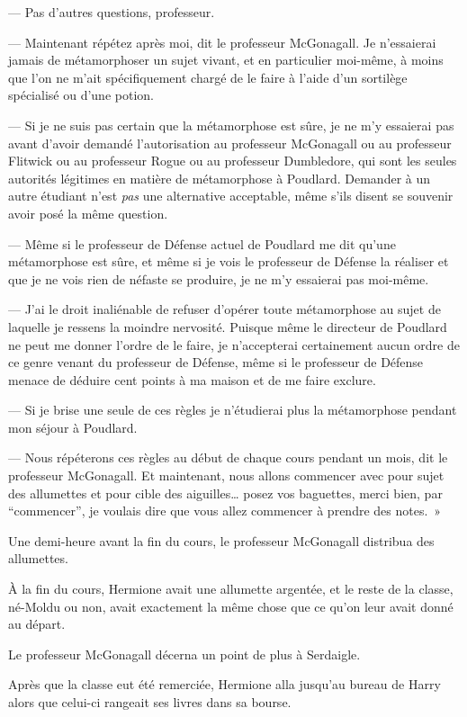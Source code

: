 --- Pas d'autres questions, professeur.

--- Maintenant répétez après moi, dit le professeur McGonagall. Je n'essaierai jamais de métamorphoser un sujet vivant, et en particulier moi-même, à moins que l'on ne m'ait spécifiquement chargé de le faire à l'aide d'un sortilège spécialisé ou d'une potion.

--- Si je ne suis pas certain que la métamorphose est sûre, je ne m'y essaierai pas avant d'avoir demandé l'autorisation au professeur McGonagall ou au professeur Flitwick ou au professeur Rogue ou au professeur Dumbledore, qui sont les seules autorités légitimes en matière de métamorphose à Poudlard. Demander à un autre étudiant n'est \emph{pas} une alternative acceptable, même s'ils disent se souvenir avoir posé la même question.

--- Même si le professeur de Défense actuel de Poudlard me dit qu'une métamorphose est sûre, et même si je vois le professeur de Défense la réaliser et que je ne vois rien de néfaste se produire, je ne m'y essaierai pas moi-même.

--- J'ai le droit inaliénable de refuser d'opérer toute métamorphose au sujet de laquelle je ressens la moindre nervosité. Puisque même le directeur de Poudlard ne peut me donner l'ordre de le faire, je n'accepterai certainement aucun ordre de ce genre venant du professeur de Défense, même si le professeur de Défense menace de déduire cent points à ma maison et de me faire exclure.

--- Si je brise une seule de ces règles je n'étudierai plus la métamorphose pendant mon séjour à Poudlard.

--- Nous répéterons ces règles au début de chaque cours pendant un mois, dit le professeur McGonagall. Et maintenant, nous allons commencer avec pour sujet des allumettes et pour cible des aiguilles… posez vos baguettes, merci bien, par “commencer”, je voulais dire que vous allez commencer à prendre des notes.~»

Une demi-heure avant la fin du cours, le professeur McGonagall distribua des allumettes.

À la fin du cours, Hermione avait une allumette argentée, et le reste de la classe, né-Moldu ou non, avait exactement la même chose que ce qu'on leur avait donné au départ.

Le professeur McGonagall décerna un point de plus à Serdaigle.

\later

Après que la classe eut été remerciée, Hermione alla jusqu'au bureau de Harry alors que celui-ci rangeait ses livres dans sa bourse.

